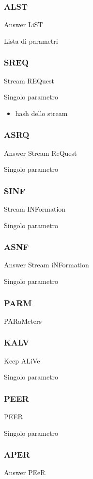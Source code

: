 \subsubsection{ALST}
%
Answer LiST

Lista di parametri

\subsubsection{SREQ}
%
Stream REQuest

Singolo parametro

\begin{itemize}
\item hash dello stream
\end{itemize}

\subsubsection{ASRQ}
%
Answer Stream ReQuest

Singolo parametro

\subsubsection{SINF}
Stream INFormation

Singolo parametro

\subsubsection{ASNF}
%
Answer Stream iNFormation

Singolo parametro

\subsubsection{PARM}
%
PARaMeters

\subsubsection{KALV}
%
Keep ALiVe

Singolo parametro

\subsubsection{PEER}
%
PEER

Singolo parametro

\subsubsection{APER}
%
Answer PEeR

